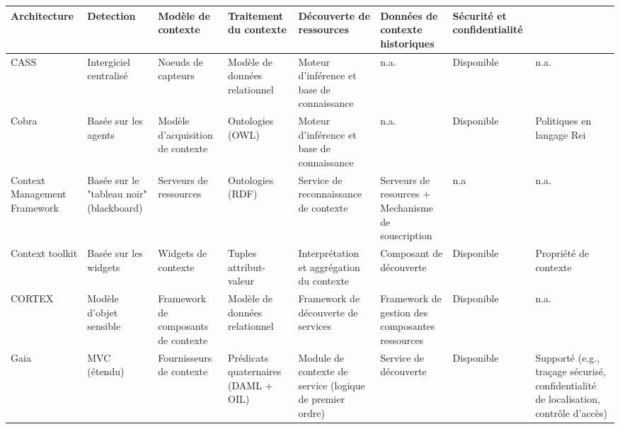 \begin{table}%
    \tiny
    \begin{tabularx}{\linewidth}{
      >{\raggedright\arraybackslash}X
      >{\raggedright\arraybackslash}X
      >{\raggedright\arraybackslash}X
      >{\raggedright\arraybackslash}X
      >{\raggedright\arraybackslash}X
      >{\raggedright\arraybackslash}X
      >{\raggedright\arraybackslash}X
      >{\raggedright\arraybackslash}X
    }
        \hline
        \textbf{Architecture} & 
        \textbf{Detection} & 
        \textbf{Modèle de contexte} &
        \textbf{Traitement du contexte} &
        \textbf{Découverte de ressources} &
        \textbf{Données de contexte historiques} &
        \textbf{Sécurité et confidentialité} & 
        \\
        \hline
        CASS &
        Intergiciel centralisé &
        Noeuds de capteurs &
        Modèle de données relationnel &
	Moteur d'inférence et base de connaissance &
        n.a. &
        Disponible &
        n.a.\\

        Cobra &
        Basée sur les agents &
        Modèle d'acquisition de contexte &
        Ontologies (OWL) &
	Moteur d'inférence et base de connaissance &
        n.a. &
        Disponible &
        Politiques en langage Rei\\

        Context Management Framework &
	Basée sur le "tableau noir" (blackboard) &
        Serveurs de ressources &
        Ontologies (RDF) &
        Service de reconnaissance de contexte &
        Serveurs de resources + Mechanisme de souscription &
        n.a &
        n.a.\\

        Context toolkit &
        Basée sur les widgets &
        Widgets de contexte &
        Tuples attribut-valeur &
        Interprétation et aggrégation du contexte &
        Composant de découverte &
        Disponible &
        Propriété de contexte\\

        CORTEX &
        Modèle d'objet sensible &
        Framework de composants de contexte &
        Modèle de données relationnel &
        Framework de découverte de services &
        Framework de gestion des composantes ressources &
        Disponible &
        n.a.\\

        Gaia &
        MVC (étendu) &
        Fournisseurs de contexte &
        Prédicats quaternaires (DAML + OIL) &
        Module de contexte de service (logique de premier ordre) &
        Service de découverte &
        Disponible &
	Supporté (e.g., traçage sécurisé, confidentialité de localisation,
	contrôle d'accès)\\


\end{tabularx}
\end{table}
